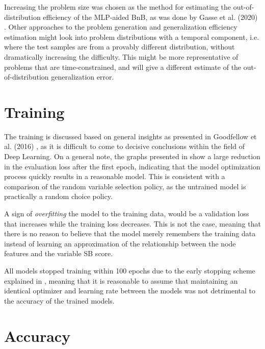 Increasing the problem size was chosen as the method for estimating the out-of-distribution efficiency of the \gls{MLP}-aided \gls{BnB}, as was done by Gasse et al. (2020) \cite{gasse2019exact}. Other approaches to the problem generation and generalization efficiency estimation might look into problem distributions with a temporal component, i.e. where the test samples are from a provably different distribution, without dramatically increasing the difficulty. This might be more representative of problems that are time-constrained, and will give a different estimate of the out-of-distribution generalization error.  




\section{Training}\label{sec:disc_training}

The training is discussed based on general insights as presented in Goodfellow et al. (2016) \cite{goodfellow2016deep}, as it is difficult to come to decisive conclusions within the field of Deep Learning. On a general note, the graphs presented in  show a large reduction in the evaluation loss after the first epoch, indicating that the model optimization process quickly results in a reasonable model. This is consistent with a comparison of the random variable selection policy, as the untrained model is practically a random choice policy.  

A sign of \textit{overfitting} the model to the training data, would be a validation loss that increases while the training loss decreases. This is not the case, meaning that there is no reason to believe that the model merely remembers the training data instead of learning an approximation of the relationship between the node features and the variable \gls{SB} score. 

All models stopped training within 100 epochs due to the early stopping scheme explained in , meaning that it is reasonable to assume that maintaining an identical optimizer and learning rate between the models was not detrimental to the accuracy of the trained models.  




\section{Accuracy}\label{sec:disc_accuracy}

